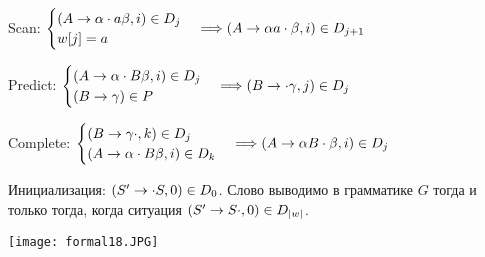 \begin{center}
    Scan: $\begin{cases} \left({A \rightarrow \alpha \cdot a \beta, i}\right) \in D_j \\ w[j] = a \end{cases} \Longrightarrow \left({A \rightarrow \alpha a \cdot \beta, i}\right) \in D_{j + 1}$
    
    Predict: $\begin{cases} \left({A \rightarrow \alpha \cdot B \beta, i}\right) \in D_j \\ \left({B \rightarrow \gamma}\right) \in P  \end{cases} \Longrightarrow \left({B \rightarrow \cdot \gamma, j}\right) \in D_j$
    
    Complete: $\begin{cases} \left({B \rightarrow \gamma \cdot, k}\right) \in D_j \\ \left({A \rightarrow \alpha \cdot B \beta , i}\right) \in D_k \end{cases} \Longrightarrow \left({A \rightarrow \alpha B \cdot \beta, i}\right) \in D_j$
\end{center}

Инициализация: $\left({S' \rightarrow \cdot S, 0}\right) \in D_0$. Слово выводимо в грамматике $G$ тогда и только тогда, когда ситуация $\left({S' \rightarrow S \cdot, 0}\right) \in D_{|w|}$.

\begin{center}
\texttt{[image: formal18.JPG]}
\end{center}

\newpage


\newpage{}


\newpage{}


\newpage{}


\newpage{}


\newpage{}


\newpage{}


\newpage{}